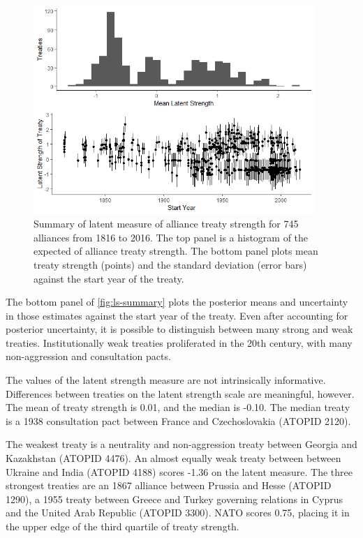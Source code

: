 \documentclass[12pt]{article}
\begin{document}
\begin{figure}
	\centering
		\includegraphics[width=0.95\textwidth]{../figures/ls-summary.png}
	\caption{Summary of latent measure of alliance treaty strength for 745 alliances from 1816 to 2016. The top panel is a histogram of the expected of alliance treaty strength. The bottom panel plots mean treaty strength (points) and the standard deviation (error bars) against the start year of the treaty.}
	\label{fig:ls-summary}
\end{figure}
	
	
The bottom panel of \autoref{fig:ls-summary} plots the posterior means and uncertainty in those estimates against the start year of the treaty. 
Even after accounting for posterior uncertainty, it is possible to distinguish between many strong and weak treaties. 
Institutionally weak treaties proliferated in the 20th century, with many non-aggression and consultation pacts. 


The values of the latent strength measure are not intrinsically informative. 
Differences between treaties on the latent strength scale are meaningful, however. 
The mean of treaty strength is 0.01, and the median is -0.10. 
The median treaty is a 1938 consultation pact between France and Czechoslovakia (ATOPID 2120). 


The weakest treaty is a neutrality and non-aggression treaty between Georgia and Kazakhstan (ATOPID 4476).  
An almost equally weak treaty between between Ukraine and India (ATOPID 4188) scores -1.36 on the latent measure.
The three strongest treaties are an 1867 alliance between Prussia and Hesse (ATOPID 1290), a 1955 treaty between Greece and Turkey governing relations in Cyprus and the United Arab Republic (ATOPID 3300).  
NATO scores 0.75, placing it in the upper edge of the third quartile of treaty strength.  
\end{document}
